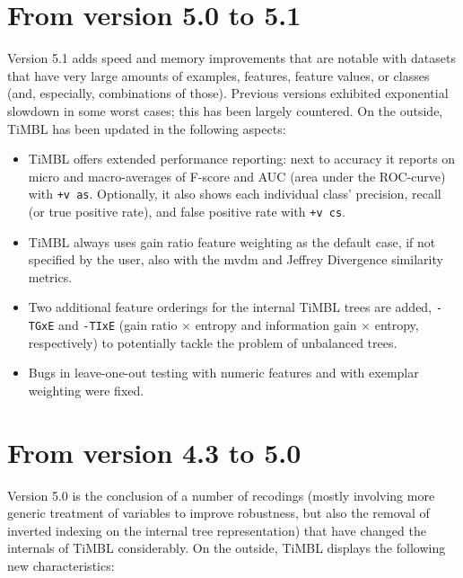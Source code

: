 \documentclass{report}
\begin{document}
\section{From version 5.0 to 5.1}

Version 5.1 adds speed and memory improvements that are notable with
datasets that have very large amounts of examples, features, feature
values, or classes (and, especially, combinations of those). Previous
versions exhibited exponential slowdown in some worst cases; this has
been largely countered. On the outside, TiMBL has been updated in the
following aspects:

\begin{itemize}

\item TiMBL offers extended performance reporting: next to accuracy it
  reports on micro and macro-averages of F-score and AUC (area under
  the ROC-curve) with {\tt +v as}. Optionally, it also shows each
  individual class' precision, recall (or true positive rate), and
  false positive rate with {\tt +v cs}.

\item TiMBL always uses gain ratio feature weighting as the default
  case, if not specified by the user, also with the {\sc mvdm} and
  Jeffrey Divergence similarity metrics.

\item Two additional feature orderings for the internal TiMBL trees
  are added, {\tt -TGxE} and {\tt -TIxE} (gain ratio $\times$ entropy
  and information gain $\times$ entropy, respectively) to potentially
  tackle the problem of unbalanced trees.

\item Bugs in leave-one-out testing with numeric features and with
  exemplar weighting were fixed.

\end{itemize}

\section{From version 4.3 to 5.0}

Version 5.0 is the conclusion of a number of recodings (mostly
involving more generic treatment of variables to improve robustness,
but also the removal of inverted indexing on the internal tree
representation) that have changed the internals of TiMBL
considerably. On the outside, TiMBL displays the following new
characteristics:
\end{document}
